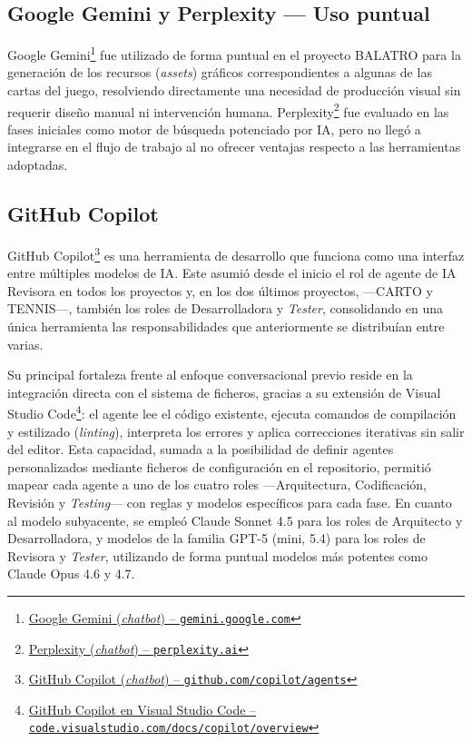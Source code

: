 \subsection{Google Gemini y Perplexity --- Uso puntual} \label{subsec:others}

Google Gemini\footnote{\href{https://gemini.google.com/app}{Google Gemini (\textit{chatbot}) -- \texttt{gemini.google.com}}} fue utilizado de forma puntual en el proyecto \ac{BALATRO} para la generación de los recursos (\textit{assets}) gráficos correspondientes a algunas de las cartas del juego, resolviendo directamente una necesidad de producción visual sin requerir diseño manual ni intervención humana. Perplexity\footnote{\href{https://www.perplexity.ai}{Perplexity (\textit{chatbot}) -- \texttt{perplexity.ai}}} fue evaluado en las fases iniciales como motor de búsqueda potenciado por \ac{IA}, pero no llegó a integrarse en el flujo de trabajo al no ofrecer ventajas respecto a las herramientas adoptadas.

\subsection{GitHub Copilot} \label{subsec:copilot}

GitHub Copilot\footnote{\href{https://github.com/copilot/agents}{GitHub Copilot (\textit{chatbot}) -- \texttt{github.com/copilot/agents}}} es una herramienta de desarrollo que funciona como una interfaz entre múltiples modelos de \ac{IA}. Este asumió desde el inicio el rol de agente de \ac{IA} Revisora en todos los proyectos y, en los dos últimos proyectos, ---\ac{CARTO} y \ac{TENNIS}---, también los roles de Desarrolladora y \textit{Tester}, consolidando en una única herramienta las responsabilidades que anteriormente se distribuían entre varias.

Su principal fortaleza frente al enfoque conversacional previo reside en la integración directa con el sistema de ficheros, gracias a su extensión de Visual Studio Code\footnote{\href{https://code.visualstudio.com/docs/copilot/overview}{GitHub Copilot en Visual Studio Code -- \texttt{code.visualstudio.com/docs/copilot/overview}}}: el agente lee el código existente, ejecuta comandos de compilación y estilizado (\textit{linting}), interpreta los errores y aplica correcciones iterativas sin salir del editor. Esta capacidad, sumada a la posibilidad de definir agentes personalizados mediante ficheros de configuración en el repositorio, permitió mapear cada agente a uno de los cuatro roles ---Arquitectura, Codificación, Revisión y \textit{Testing}--- con reglas y modelos específicos para cada fase. En cuanto al modelo subyacente, se empleó Claude Sonnet 4.5 para los roles de Arquitecto y Desarrolladora, y modelos de la familia GPT-5 (mini, 5.4) para los roles de Revisora y \textit{Tester}, utilizando de forma puntual modelos más potentes como Claude Opus 4.6 y 4.7.

